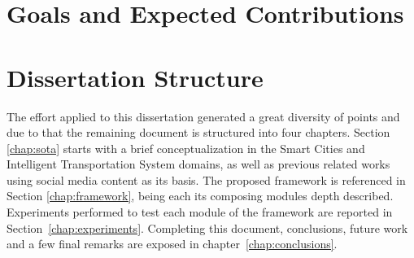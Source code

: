 \section{Goals and Expected Contributions}\label{sec:contributions}


\section{Dissertation Structure}\label{sec:diss_structure}
The effort applied to this dissertation generated a great diversity of points and due to that the remaining document is structured into four chapters.
Section \ref{chap:sota} starts with a brief conceptualization in the Smart Cities and Intelligent Transportation System domains, as well as previous related works using social media content as its basis.
The proposed framework is referenced in Section \ref{chap:framework}, being each its composing modules depth described.
Experiments performed to test each module of the framework are reported in Section~\ref{chap:experiments}.
Completing this document, conclusions, future work and a few final remarks are exposed in chapter~\ref{chap:conclusions}.